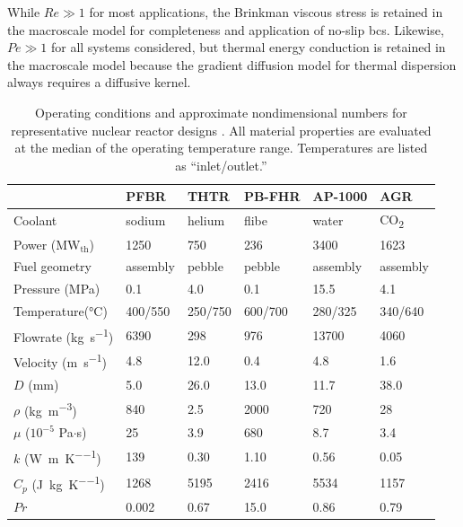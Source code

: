 While \(Re\gg1\) for most applications, the Brinkman viscous stress is retained in the macroscale model for completeness and application of no-slip \glspl{bc}. Likewise, \(Pe\gg1\) for all systems considered, but thermal energy conduction is retained in the macroscale model because the gradient diffusion model for thermal dispersion always requires a diffusive kernel.

\begin{table}[!h]
\caption{Operating conditions and approximate nondimensional numbers for representative nuclear reactor designs \cite{pfbr,pfbrTH,thtr_1990,pbfhr,ap1000,ap1000_2,nonbol}. All material properties are evaluated at the median of the operating temperature range. Temperatures are listed as ``inlet/outlet.''}
\centering
\begin{tabular}{|l |l l l l l|}
\hline\hline
 								& PFBR		& THTR 			& PB-FHR 				& AP-1000 			& AGR\Tstrut\Bstrut \\
\hline
 Coolant							& sodium			& helium				& \gls{flibe}				& water				& CO\textsubscript{2}\Tstrut\\
 Power (MW$_\text{th}$)				& 1250			& 750				& 236				& 3400				& 1623\\
 Fuel	 geometry							& assembly		& pebble				& pebble				& assembly			& assembly\Bstrut\\
 \hline
Pressure (\si{\mega\pascal})						& 0.1				& 4.0					& 0.1					& 15.5				& 4.1\Tstrut\\
Temperature(\si{\celsius})				& 400/550		& 250/750				& 600/700				& 280/325				& 340/640\\
Flowrate (\si{\kilo\gram\per\second})						& 6390			& 298				& 976				& 13700				& 4060\\
Velocity (\si{\meter\per\second})						& 4.8				& 12.0				& 0.4					& 4.8				& 1.6\Bstrut\\
 \hline
 \(D\) (mm)						& 5.0				& 26.0				& 13.0				& 11.7			& 38.0\Tstrut\\
 \(\rho\) (\si{\kilo\gram\per\cubic\meter})			& 840			& 2.5					& 2000				& 720			& 28\\
 \(\mu\) (\(10^{-5}\) Pa\(\cdot\)s)			& 25				& 3.9					& 680				& 8.7				& 3.4\\
 \(k\) (\si{\watt\per\meter\per\kelvin})					& 139			& 0.30				& 1.10				& 0.56			& 0.05\\
 \(C_p\) (\si{\joule\per\kilo\gram\per\kelvin})				& 1268			& 5195				& 2416				& 5534			& 1157\Bstrut\\
  \hline
 \(Pr\)							& 0.002			& 0.67				& 15.0				& 0.86			& 0.79\Tstrut\\

\end{tabular}
\end{table}
